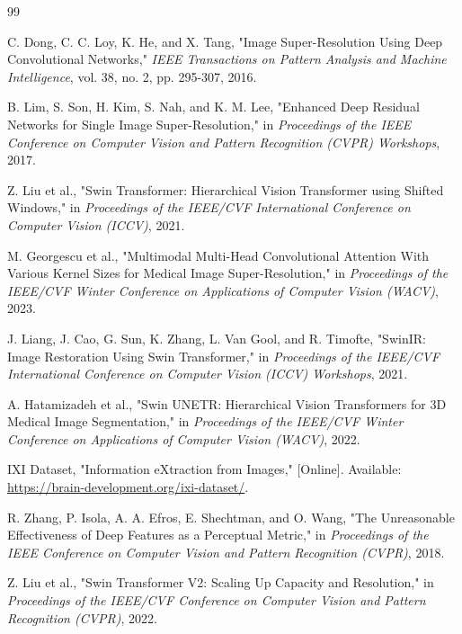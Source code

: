 \renewcommand{\bibname}{REFERENCES}
\begin{thebibliography}{99}

 C. Dong, C. C. Loy, K. He, and X. Tang, "Image Super-Resolution Using Deep Convolutional Networks," \textit{IEEE Transactions on Pattern Analysis and Machine Intelligence}, vol. 38, no. 2, pp. 295-307, 2016.

 B. Lim, S. Son, H. Kim, S. Nah, and K. M. Lee, "Enhanced Deep Residual Networks for Single Image Super-Resolution," in \textit{Proceedings of the IEEE Conference on Computer Vision and Pattern Recognition (CVPR) Workshops}, 2017.

 Z. Liu et al., "Swin Transformer: Hierarchical Vision Transformer using Shifted Windows," in \textit{Proceedings of the IEEE/CVF International Conference on Computer Vision (ICCV)}, 2021.

 M. Georgescu et al., "Multimodal Multi-Head Convolutional Attention With Various Kernel Sizes for Medical Image Super-Resolution," in \textit{Proceedings of the IEEE/CVF Winter Conference on Applications of Computer Vision (WACV)}, 2023.

 J. Liang, J. Cao, G. Sun, K. Zhang, L. Van Gool, and R. Timofte, "SwinIR: Image Restoration Using Swin Transformer," in \textit{Proceedings of the IEEE/CVF International Conference on Computer Vision (ICCV) Workshops}, 2021.

 A. Hatamizadeh et al., "Swin UNETR: Hierarchical Vision Transformers for 3D Medical Image Segmentation," in \textit{Proceedings of the IEEE/CVF Winter Conference on Applications of Computer Vision (WACV)}, 2022.

 IXI Dataset, "Information eXtraction from Images," [Online]. Available: \url{https://brain-development.org/ixi-dataset/}.

 R. Zhang, P. Isola, A. A. Efros, E. Shechtman, and O. Wang, "The Unreasonable Effectiveness of Deep Features as a Perceptual Metric," in \textit{Proceedings of the IEEE Conference on Computer Vision and Pattern Recognition (CVPR)}, 2018.

 Z. Liu et al., "Swin Transformer V2: Scaling Up Capacity and Resolution," in \textit{Proceedings of the IEEE/CVF Conference on Computer Vision and Pattern Recognition (CVPR)}, 2022.


\end{thebibliography}
